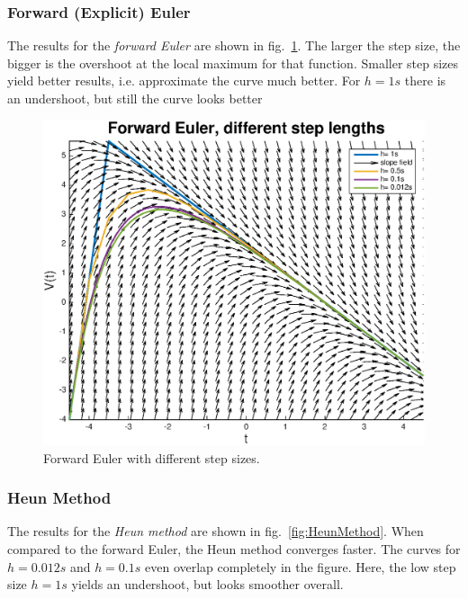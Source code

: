 \documentclass[
a4paper, 
12pt, 
]{article}
\begin{document}
	\subsubsection{Forward (Explicit) Euler}
	The results for the \emph{forward Euler} are shown in fig.~\ref{fig:ForwardEuler}. The larger the step size, the bigger is the overshoot at the local maximum for that function. Smaller step sizes yield better results, i.e. approximate the curve much better. For $h = 1s$ there is an undershoot, but still the curve looks better

\begin{figure}[h]
\centering
\includegraphics[width=0.85\linewidth]{Plots/ForwardEuler}
\caption{Forward Euler with different step sizes.}
\label{fig:ForwardEuler}
\end{figure}



\clearpage
	\subsubsection{Heun Method}
	The results for the \emph{Heun method} are shown in fig.~\ref{fig:HeunMethod}. When compared to the forward Euler, the Heun method converges faster. The curves for $h = 0.012s$ and $h = 0.1s$ even overlap completely in the figure. Here, the low step size $h = 1s$ yields an undershoot, but looks smoother overall. 
	
\end{document}
